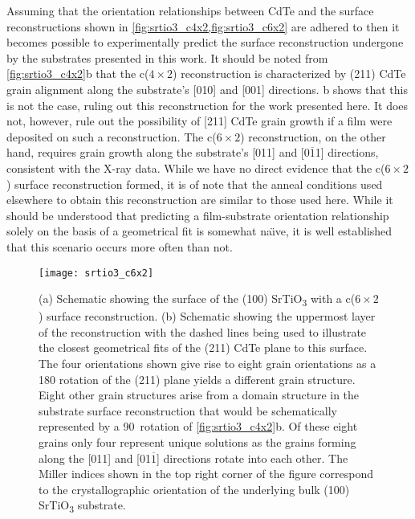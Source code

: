 Assuming that the orientation relationships between CdTe
and the surface reconstructions shown in \cref{fig:srtio3_c4x2,fig:srtio3_c6x2} are adhered
to then it becomes possible to experimentally predict the surface
reconstruction undergone by the substrates presented in this
work. It should be noted from \cref{fig:srtio3_c4x2}b that the c($4\times2$)
reconstruction is characterized by (211) CdTe grain alignment
along the substrate’s [010] and [001] directions. b
shows that this is not the case, ruling out this reconstruction for the
work presented here. It does not, however, rule out the possibility
of [211] CdTe grain growth if a film were deposited on such a
reconstruction. The c($6\times2$) reconstruction, on the other hand,
requires grain growth along the substrate’s [011] and [0$\overline{1}$1]
directions, consistent with the X-ray data. While we have no direct
evidence that the c($6\times2$) surface reconstruction formed, it is of
note that the anneal conditions used elsewhere\cite{Jiang1996} to obtain this
reconstruction are similar to those used here. While it should be
understood that predicting a film-substrate orientation relationship solely on the basis of a geometrical fit is somewhat na\"{\i}ve, it is well established that this scenario occurs more often than not.
\begin{figure}
    \centering
    \texttt{[image: srtio3\_c6x2]}
    \caption[CdTe on c(6$\times$2) SrTiO\textsubscript{3} surface]{\label{fig:srtio3_c6x2}(a) Schematic showing the surface of the (100) SrTiO\textsubscript{3} with a c($6\times2$) surface reconstruction. (b) Schematic showing the uppermost layer of the reconstruction with the
        dashed lines being used to illustrate the closest geometrical fits of the (211) CdTe plane to this surface. The four orientations shown give rise to eight grain orientations as a
        180\degree{} rotation of the (211) plane yields a different grain structure. Eight other grain structures arise from a domain structure in the substrate surface reconstruction that
        would be schematically represented by a 90\degree~rotation of \cref{fig:srtio3_c4x2}b. Of these eight grains only four represent unique solutions as the grains forming along the [011] and [01$\overline{1}$]
        directions rotate into each other. The Miller indices shown in the top right corner of the figure correspond to the crystallographic orientation of the underlying bulk (100)
        SrTiO\textsubscript{3} substrate.}
\end{figure}

